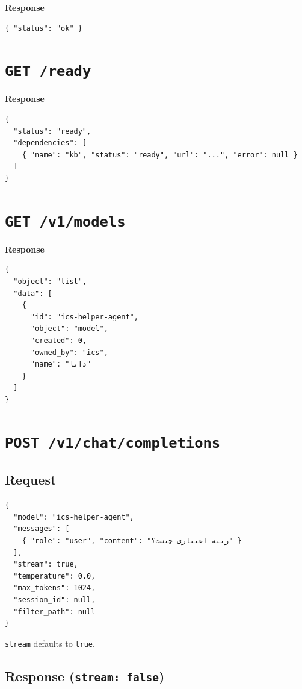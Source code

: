 \documentclass[11pt,a4paper]{article}
\begin{document}
\noindent\textbf{Response}

\begin{lstlisting}
{ "status": "ok" }
\end{lstlisting}

\section{\texttt{GET /ready}}

\noindent\textbf{Response}

\begin{lstlisting}
{
  "status": "ready",
  "dependencies": [
    { "name": "kb", "status": "ready", "url": "...", "error": null }
  ]
}
\end{lstlisting}

\section{\texttt{GET /v1/models}}

\noindent\textbf{Response}

\begin{lstlisting}
{
  "object": "list",
  "data": [
    {
      "id": "ics-helper-agent",
      "object": "model",
      "created": 0,
      "owned_by": "ics",
      "name": "دانا"
    }
  ]
}
\end{lstlisting}

\section{\texttt{POST /v1/chat/completions}}

\subsection{Request}

\begin{lstlisting}
{
  "model": "ics-helper-agent",
  "messages": [
    { "role": "user", "content": "رتبه اعتباری چیست؟" }
  ],
  "stream": true,
  "temperature": 0.0,
  "max_tokens": 1024,
  "session_id": null,
  "filter_path": null
}
\end{lstlisting}

\noindent\texttt{stream} defaults to \texttt{true}.

\subsection{Response (\texttt{stream: false})}
\end{document}
